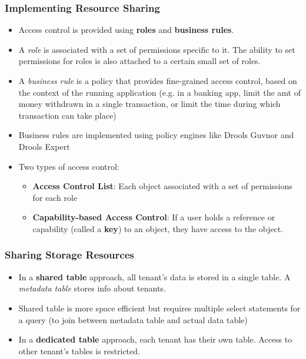 \documentclass{article}
\begin{document}
\subsubsection{Implementing Resource Sharing}
\begin{itemize}
    \item Access control is provided using \textbf{roles} and \textbf{business rules}. 
    
    \item A \textit{role} is associated with a set of permissions specific to it. The ability to set permissions for roles is also attached to a certain small set of roles. 
    
    \item A \textit{business rule} is a policy that provides fine-grained access control, based on the context of the running application (e.g. in a banking app, limit the amt of money withdrawn in a single transaction, or limit the time during which transaction can take place)
    
    \item Business rules are implemented using policy engines like Drools Guvnor and Drools Expert
    
    \item Two types of access control:
    \begin{itemize}
        \item \textbf{Access Control List}: Each object associated with a set of permissions for each role
        
        \item \textbf{Capability-based Access Control}: If a user holds a reference or capability (called a \textbf{key}) to an object, they have access to the object. 
    \end{itemize} 
\end{itemize}

\subsubsection{Sharing Storage Resources}
\begin{itemize}
    \item In a \textbf{shared table} approach, all tenant's data is stored in a single table. A \textit{metadata table} stores info about tenants.
    
    \item Shared table is more space efficient but requires multiple select statements for a query (to join between metadata table and actual data table)
    
    \item In a \textbf{dedicated table} approach, each tenant has their own table. Access to other tenant's tables is restricted. 
\end{itemize}
\end{document}
